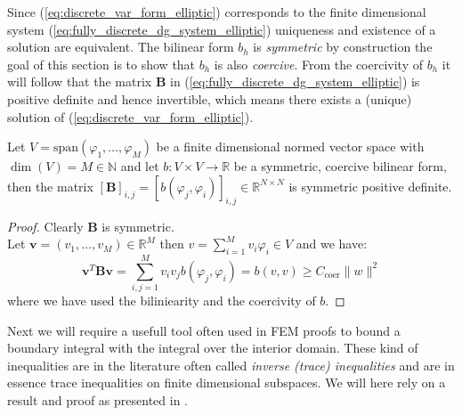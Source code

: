 Since (\ref{eq:discrete_var_form_elliptic}) corresponds to the finite dimensional
system (\ref{eq:fully_discrete_dg_system_elliptic}) uniqueness and existence of a solution
are equivalent. 
The bilinear form $b_h$ is \textit{symmetric} by construction 
the goal of this section is to show that $b_h$ is also \textit{coercive}. 
From the coercivity of $b_h$ it will follow that the matrix $\textbf{B}$ in (\ref{eq:fully_discrete_dg_system_elliptic})
is positive definite and hence invertible, which means there exists a (unique) solution
of (\ref{eq:discrete_var_form_elliptic}).
\begin{lemma}
    Let $V = \text{span}(\varphi_1,\ldots,\varphi_M)$ be a finite dimensional 
    normed vector space with $\dim(V) = M\in \mathbb{N}$ and let
    $b:V \times V \to \mathbb{R}$ be a symmetric, coercive bilinear form,
    then the matrix ${[\textbf{B}]}_{i,j} = {[b(\varphi_j, \varphi_i)]}_{i,j}\in \mathbb{R}^{N\times N}$
    is symmetric positive definite.
\end{lemma}
\begin{proof}
    Clearly $\textbf{B}$ is symmetric. \\
    Let $\textbf{v}=(v_1,\ldots,v_M)\in \mathbb{R}^M$ then $v = \sum_{i=1}^{M}
    v_i \varphi_i\in V$ and we have:
    \[
        \textbf{v}^{T}\textbf{B}\textbf{v} = \sum_{i,j=1}^{M}v_i v_j b(\varphi_j,\varphi_i) = b(v,v) \geq
        C_{\text{coer}} \|w\|^2
    \]
    where we have used the biliniearity and the coercivity of $b$.
\end{proof}
Next we will require a usefull tool often used in FEM proofs to bound
a boundary integral with the integral over the interior domain. These kind
of inequalities are in the literature often called \textit{inverse (trace) inequalities}
and are in essence trace inequalities on finite dimensional subspaces.
We will here rely on a result and proof as presented in \cite{warburtonHesthaven2003ineq}.

